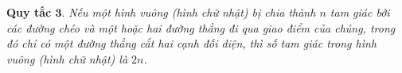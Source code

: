 		\begin{figure}[H]
			\centering
			\vspace*{-5pt}
			\captionsetup{labelformat= empty, justification=centering}
			\captionsetup[subfigure]{labelformat=empty}
			\hfill{}
			\hfill
			\hfill
			\vspace*{-10pt}
		\end{figure} 
	\vskip 0.1cm
	\textbf{\color{toancuabi}Quy tắc $\pmb{3.}$} \textit{Nếu một hình vuông (hình chữ nhật) bị chia thành $n$ tam giác bởi các đường chéo và một hoặc hai đường thẳng đi qua giao điểm của chúng, trong đó chỉ có một đường thẳng cắt hai cạnh đối diện, thì số tam giác trong hình vuông (hình chữ nhật) là $2n$.}
	\vskip 0.1cm
